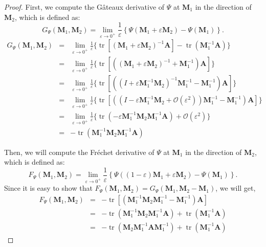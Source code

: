 \documentclass[preprint,12pt]{elsarticle}
\DeclareMathOperator{\tr}{tr} \DeclareMathOperator{\err}{err}
\begin{document}
\begin{proof}
First, we compute the G\^{a}teaux derivative of $\Psi$ at
$\boldsymbol{M}_1$ in the direction of $\boldsymbol{M}_2$, which is
defined as:
$$G_{\Psi}(\boldsymbol{M}_1,\boldsymbol{M}_2)=\lim_{\varepsilon\rightarrow0^+}\frac{1}{\varepsilon}\left\{\Psi(\boldsymbol{M}_1+\varepsilon\boldsymbol{M}_2)-\Psi(\boldsymbol{M}_1)\right\}.$$
\begin{eqnarray*}
G_{\Psi}(\boldsymbol{M}_1,\boldsymbol{M}_2) &=&
\lim_{\varepsilon\rightarrow0^+}\frac{1}{\varepsilon}\{\tr[(\boldsymbol{M}_1+\varepsilon\boldsymbol{M}_2)^{-1}\boldsymbol{A}]-\tr(\boldsymbol{M}_1^{-1}\boldsymbol{A})\}\\
&=&
\lim_{\varepsilon\rightarrow0^+}\frac{1}{\varepsilon}\{\tr[((\boldsymbol{M}_1+\varepsilon\boldsymbol{M}_2)^{-1}+\boldsymbol{M}_1^{-1})\boldsymbol{A}]\}\\
&=&
\lim_{\varepsilon\rightarrow0^+}\frac{1}{\varepsilon}\{\tr[((I+\varepsilon\boldsymbol{M}_1^{-1}\boldsymbol{M}_2)^{-1}\boldsymbol{M}_1^{-1}-\boldsymbol{M}_1^{-1})\boldsymbol{A}]\}\\
&=&
\lim_{\varepsilon\rightarrow0^+}\frac{1}{\varepsilon}\{\tr[((I-\varepsilon\boldsymbol{M}_1^{-1}\boldsymbol{M}_2+\mathcal{O}(\varepsilon^2))\boldsymbol{M}_1^{-1}-\boldsymbol{M}_1^{-1})\boldsymbol{A}]\}\\
&=&
\lim_{\varepsilon\rightarrow0^+}\frac{1}{\varepsilon}\{\tr(-\varepsilon\boldsymbol{M}_1^{-1}\boldsymbol{M}_2\boldsymbol{M}_1^{-1}\boldsymbol{A})+\mathcal{O}(\varepsilon^2)\}\\
&=&
-\tr(\boldsymbol{M}_1^{-1}\boldsymbol{M}_2\boldsymbol{M}_1^{-1}\boldsymbol{A})
\end{eqnarray*}

Then, we will compute the Fr\'{e}chet derivative of $\Psi$ at
$\boldsymbol{M}_1$ in the direction of $\boldsymbol{M}_2$, which is
defined as:
$$F_{\Psi}(\boldsymbol{M}_1,\boldsymbol{M}_2)=\lim_{\varepsilon\rightarrow0^+}\frac{1}{\varepsilon}\left\{\Psi((1-\varepsilon)\boldsymbol{M}_1+\varepsilon\boldsymbol{M}_2)-\Psi(\boldsymbol{M}_1)\right\}.$$
Since it is easy to show that
$F_{\Psi}(\boldsymbol{M}_1,\boldsymbol{M}_2)=G_{\Psi}(\boldsymbol{M}_1,\boldsymbol{M}_2-\boldsymbol{M}_1)$,
we will get,
\begin{eqnarray*}
F_{\Psi}(\boldsymbol{M}_1,\boldsymbol{M}_2)&=&-\tr[(\boldsymbol{M}_1^{-1}\boldsymbol{M}_2\boldsymbol{M}_1^{-1}-\boldsymbol{M}_1^{-1})\boldsymbol{A}]\\
&=&-\tr(\boldsymbol{M}_1^{-1}\boldsymbol{M}_2\boldsymbol{M}_1^{-1}\boldsymbol{A})+\tr(\boldsymbol{M}^{-1}_1\boldsymbol{A})\\
&=&
-\tr(\boldsymbol{M}_2\boldsymbol{M}_1^{-1}\boldsymbol{A}\boldsymbol{M}_1^{-1})+\tr(\boldsymbol{M}^{-1}_1\boldsymbol{A})
\end{eqnarray*}


\end{proof}
\end{document}
